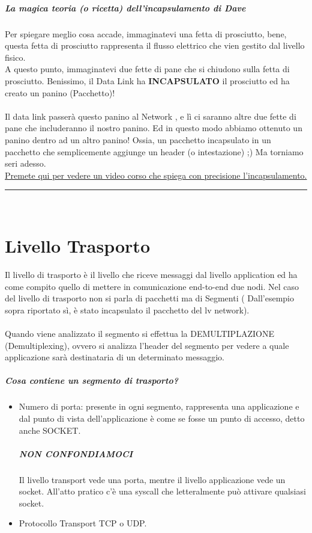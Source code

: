 \documentclass[12pt, a4paper, openany, twoside]{book}
\begin{document}
\paragraph{La magica teoria (o ricetta) dell'incapsulamento di Dave} 
Per spiegare meglio cosa accade, immaginatevi una fetta di prosciutto, bene, 
questa fetta di prosciutto rappresenta il \color{red}flusso elettrico\color{black} che vien gestito 
dal livello fisico. \\
A questo punto, immaginatevi due fette di pane che si chiudono sulla fetta di 
prosciutto. Benissimo, il Data Link ha \textbf{INCAPSULATO} il prosciutto ed ha
creato un panino (\color{red}Pacchetto\color{black})! \\ \\
Il data link passerà questo panino al \color{red}Network \color{black}, e lì ci 
saranno altre due fette di pane che includeranno il nostro panino. 
Ed in questo modo abbiamo ottenuto un panino dentro ad un altro panino! Ossia,
un pacchetto incapsulato in un pacchetto che semplicemente aggiunge un header 
(o intestazione) ;) Ma torniamo seri adesso. \\
\href{https://www.youtube.com/watch?v=6HHe1AIUMM4}{Premete qui per vedere un
video corso che spiega con precisione l'incapsulamento.}
\\
{\color{black} \rule{\linewidth}{0.2mm} }
\\
\chapter{Livello Trasporto}
Il livello di trasporto è il livello che riceve messaggi dal livello application
ed ha come compito quello di mettere in comunicazione end-to-end due nodi.
Nel caso del livello di trasporto non si parla di pacchetti ma di Segmenti (
Dall'esempio sopra riportato sì, è stato incapsulato il pacchetto del lv network).
\\ \\
Quando viene analizzato il segmento si effettua la DEMULTIPLAZIONE 
(Demultiplexing), ovvero si analizza l'header del segmento per vedere a quale
applicazione sarà destinataria di un determinato messaggio.
\paragraph{Cosa contiene un segmento di trasporto?}
\begin{itemize}
	\item Numero di porta: presente in ogni segmento, rappresenta una applicazione
	e dal punto di vista dell'applicazione è come se fosse un punto di 
	accesso, detto anche SOCKET. 
	\paragraph{NON CONFONDIAMOCI} Il livello transport vede una porta, mentre
	il livello applicazione vede un socket. All'atto pratico c'è una syscall
	che letteralmente può attivare qualsiasi socket.
	\item Protocollo Transport TCP o UDP.
\end{itemize}
\end{document}
